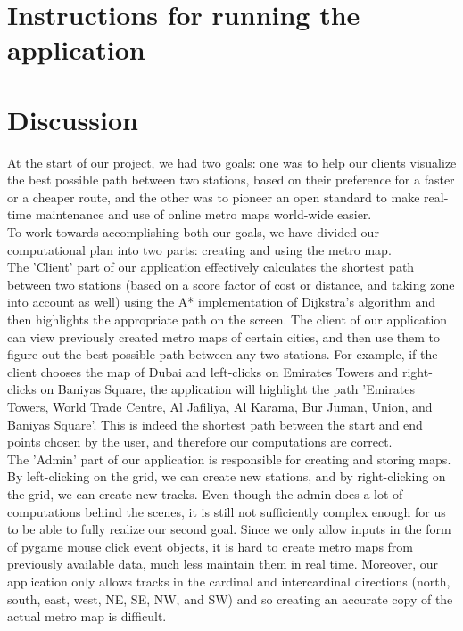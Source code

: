 \documentclass[fontsize=11pt]{article}
\begin{document}
    \section*{Instructions for running the application}
    \section*{Discussion}
    At the start of our project, we had two goals: one was to help our clients visualize the best possible path between two stations, based on their preference for a faster or a cheaper route, and the other was to pioneer an open standard to make real-time maintenance and use of online metro maps world-wide easier. \\

To work towards accomplishing both our goals, we have divided our computational plan into two parts: creating and using the metro map. \\

The 'Client' part of our application effectively calculates the shortest path between two stations (based on a score factor of cost or distance, and taking zone into account as well) using the A* implementation of Dijkstra's algorithm and then highlights the appropriate path on the screen. The client of our application can view previously created metro maps of certain cities, and then use them to figure out the best possible path between any two stations. For example, if the client chooses the map of Dubai and left-clicks on Emirates Towers and right-clicks on Baniyas Square, the application will highlight the path 'Emirates Towers, World Trade Centre, Al Jafiliya, Al Karama, Bur Juman, Union, and Baniyas Square'. This is indeed the shortest path between the start and end points chosen by the user, and therefore our computations are correct. \\

The 'Admin' part of our application is responsible for creating and storing maps. By left-clicking on the grid, we can create new stations, and by right-clicking on the grid, we can create new tracks. Even though the admin does a lot of computations behind the scenes, it is still not sufficiently complex enough for us to be able to fully realize our second goal. Since we only allow inputs in the form of pygame mouse click event objects, it is hard to create metro maps from previously available data, much less maintain them in real time. Moreover, our application only allows tracks in the cardinal and intercardinal directions (north, south, east, west, NE, SE, NW, and SW) and so creating an accurate copy of the actual metro map is difficult. \\
\end{document}
